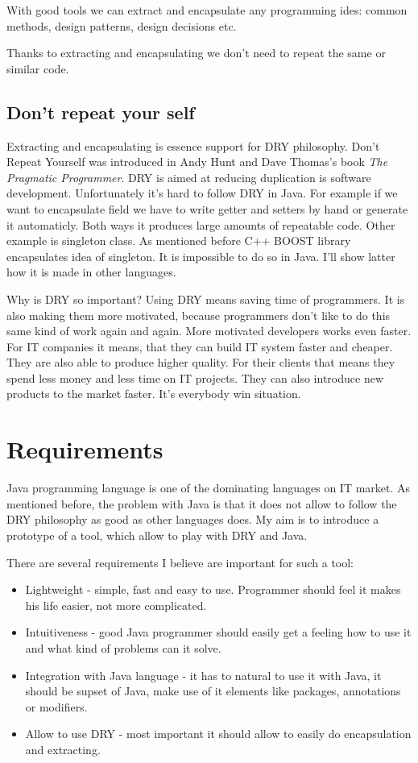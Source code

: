 With good tools we can extract and encapsulate any programming ides: common methods, design patterns, design decisions etc.

Thanks to extracting and encapsulating we don't need to repeat the same or similar code.

\subsection{Don't repeat your self}
Extracting and encapsulating is essence support for DRY philosophy. Don't Repeat Yourself was 
introduced in Andy Hunt and Dave Thomas's book \emph{The Pragmatic Programmer}\cite{Hunt99}.
DRY is aimed at reducing duplication is software development. Unfortunately it's hard to follow DRY in Java.
For example if we want to encapsulate field we have to write getter and setters by hand or generate it automaticly.
Both ways it produces large amounts of repeatable code. Other example is singleton class. As mentioned before C++ BOOST library encapsulates idea of singleton. It is impossible to do so in Java. 
I'll show latter how it is made in other languages.

Why is DRY so important?
Using DRY means saving time of programmers. It is also making them more motivated, because programmers don't like to do this same kind of work again and again.
More motivated developers works even faster.
For IT companies it means, that they can build IT system faster and cheaper. They are also able to produce higher quality. 
For their clients that means they spend less money and less time on IT projects. They can also introduce new products to the market faster. It's everybody win situation.


\section{Requirements}
Java programming language is one of the dominating languages on IT market. 
As mentioned before, the problem with Java is that it does not allow to follow the DRY philosophy as good as other languages does.
My aim is to introduce a prototype of a tool, which allow to play with DRY and Java.

There are several requirements I believe are important for such a tool:
\begin{itemize}
 \item Lightweight - simple, fast and easy to use. Programmer should feel it makes his life easier, not more complicated. 
 \item Intuitiveness - good Java programmer should easily get a feeling how to use it and what kind of problems can it solve.
 \item Integration with Java language - it has to natural to use it with Java, it should be supset of Java, make use of it elements like packages, annotations or modifiers.
 \item Allow to use DRY - most important it should allow to easily do encapsulation and extracting.
\end{itemize}


